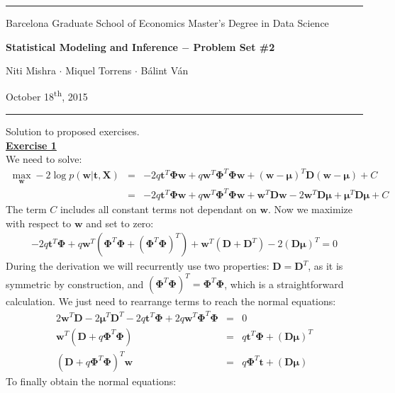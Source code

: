 \documentclass[a4paper, 11pt]{article}\usepackage[]{graphicx}\usepackage[]{color}
\newcommand{\header}[4]{
	\begin{center}
		\rule{\linewidth}{0.5pt}
		
		{\small{#1}}
      
        \vspace{0.2in}
        
		{\large{#2}}
		
        \vspace{0.2in}
        
		{\small{#3}}
		
		\vspace{0.15in}
		
		{#4}
		
		\vspace{-0.1in}
		\rule{\linewidth}{0.6pt}
	\end{center}
}
\begin{document}
 
\header{\sc Barcelona Graduate School of Economics \hfill Master's Degree in Data Science}{\bf Statistical Modeling and Inference $-$ Problem Set \#2}{\sc Niti Mishra $\cdot$ Miquel Torrens $\cdot$ B\'alint V\'an}{October 18\textsuperscript{th}, 2015}
Solution to proposed exercises.\\
\newline \textbf{\underline{Exercise 1}}\\
\newline We need to solve:
\begin{eqnarray}
\max_{\mathbf{w}} -2 \log p(\mathbf{w | t, X}) &=&  -2q \mathbf{t}^T \mathbf{\Phi w} + q \mathbf{w}^T \mathbf{\Phi}^T \mathbf{\Phi w} + (\mathbf{w - \mu})^T \mathbf{D} (\mathbf{w - \mu}) + C \nonumber \\
&=&  -2q \mathbf{t}^T \mathbf{\Phi w} + q \mathbf{w}^T \mathbf{\Phi}^T \mathbf{\Phi w} + \mathbf{w}^T \mathbf{D w} - 2 \mathbf{w}^T \mathbf{D} \mathbf{\mu} + \mathbf{\mu}^T \mathbf{D \mu} + C \nonumber
\end{eqnarray}
The term $C$ includes all constant terms not dependant on $\mathbf{w}$. Now we maximize with respect to $\mathbf{w}$ and set to zero:
\begin{eqnarray}
-2q \mathbf{t}^T \mathbf{\Phi} + q \mathbf{w}^T \left(\mathbf{\Phi}^T \mathbf{\Phi} + \left( \mathbf{\Phi}^T \mathbf{\Phi} \right)^T \right) + \mathbf{w}^T \left( \mathbf{D} + \mathbf{D}^T \right) - 2 \left( \mathbf{D} \mathbf{\mu} \right)^T = 0 \nonumber
\end{eqnarray}
During the derivation we will recurrently use two properties: $\mathbf{D} = \mathbf{D}^T$, as it is symmetric by construction, and $\left( \mathbf{\Phi}^T \mathbf{\Phi} \right)^T = \mathbf{\Phi}^T \mathbf{\Phi}$, which is a straightforward calculation. We just need to rearrange terms to reach the normal equations:
\begin{eqnarray}
2 \mathbf{w}^T\mathbf{D} -2 \mathbf{\mu}^T \mathbf{D}^T -2 q \mathbf{t}^T \mathbf{\Phi} + 2q\mathbf{w}^T \mathbf{\Phi}^T \mathbf{\Phi} &=& 0 \nonumber \\
\mathbf{w}^T \left( \mathbf{D} + q \mathbf{\Phi}^T \mathbf{\Phi} \right) &=& q\mathbf{t}^T \mathbf{\Phi} + \left( \mathbf{D\mu} \right)^T  \nonumber \\
\left( \mathbf{D} + q \mathbf{\Phi}^T \mathbf{\Phi} \right)^T \mathbf{w} &=& q\mathbf{\Phi}^T \mathbf{t} + \left( \mathbf{D\mu} \right) \nonumber
\end{eqnarray}
To finally obtain the normal equations:
\end{document}
